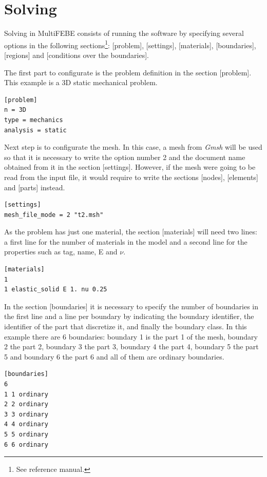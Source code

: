 \documentclass[a4]{article}
\begin{document}
\section{Solving}
Solving in MultiFEBE consists of running the software by specifying several options in the following sections\footnote{See reference manual.}: [problem], [settings], [materials], [boundaries], [regions] and [conditions over the boundaries].

The first part to configurate is the problem definition in the section [problem]. This example is a 3D static mechanical problem.  

\begin{Verbatim}	
[problem]
n = 3D
type = mechanics
analysis = static
\end{Verbatim}

Next step is to configurate the mesh. In this case, a mesh from \textit{Gmsh} will be used so that it is necessary to write the option number 2 and the document name obtained from it in the section [settings]. However, if the mesh were going to be read from the input file, it would require to write the sections [nodes], [elements] and [parts] instead.

\begin{Verbatim}	
[settings]
mesh_file_mode = 2 "t2.msh"
\end{Verbatim}

As the problem has just one material, the section [materials] will need two lines: a first line for the number of materials in the model and a second line for the properties such as tag, name, E and $\nu$.

\begin{Verbatim}	
[materials]
1
1 elastic_solid E 1. nu 0.25
\end{Verbatim}

In the section [boundaries] it is necessary to specify the number of boundaries in the first line and a line per boundary by indicating the boundary identifier,
the identifier of the part that discretize it, and finally the boundary class. In this example there are 6 boundaries: boundary 1 is the part 1 of the mesh, boundary 2 the part 2, boundary 3 the part 3, boundary 4 the part 4, boundary 5 the part 5 and boundary 6 the part 6 and all of them are ordinary boundaries.

\begin{Verbatim}	
[boundaries]
6
1 1 ordinary
2 2 ordinary
3 3 ordinary
4 4 ordinary
5 5 ordinary
6 6 ordinary
\end{Verbatim}
\end{document}
